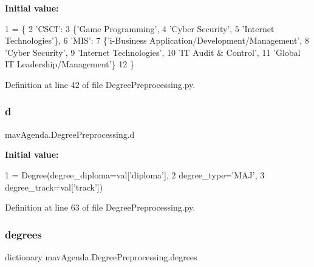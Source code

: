 {\bfseries Initial value\+:}
\begin{DoxyCode}
1 =  \{
2     \textcolor{stringliteral}{'CSCI'}:
3         \{\textcolor{stringliteral}{'Game Programming'},
4          \textcolor{stringliteral}{'Cyber Security'},
5          \textcolor{stringliteral}{'Internet Technologies'}\},
6     \textcolor{stringliteral}{'MIS'}:
7         \{\textcolor{stringliteral}{'i-Business Application/Development/Management'},
8          \textcolor{stringliteral}{'Cyber Security'},
9          \textcolor{stringliteral}{'Internet Technologies'},
10          \textcolor{stringliteral}{'IT Audit & Control'},
11          \textcolor{stringliteral}{'Global IT Leadership/Management'}\}
12 \}
\end{DoxyCode}


Definition at line 42 of file Degree\+Preprocessing.\+py.

\mbox{\label{namespacemavAgenda_1_1DegreePreprocessing_a9391b9dbb13717ada260004b0d8ce62b}} 
\subsubsection{\texorpdfstring{d}{d}}
{\footnotesize\ttfamily mav\+Agenda.\+Degree\+Preprocessing.\+d}

{\bfseries Initial value\+:}
\begin{DoxyCode}
1 =  Degree(degree\_diploma=val[\textcolor{stringliteral}{'diploma'}],
2                degree\_type=\textcolor{stringliteral}{'MAJ'},
3                degree\_track=val[\textcolor{stringliteral}{'track'}])
\end{DoxyCode}


Definition at line 63 of file Degree\+Preprocessing.\+py.

\mbox{\label{namespacemavAgenda_1_1DegreePreprocessing_a9211e5530909400d8a6c686011822a43}} 
\subsubsection{\texorpdfstring{degrees}{degrees}}
{\footnotesize\ttfamily dictionary mav\+Agenda.\+Degree\+Preprocessing.\+degrees}

